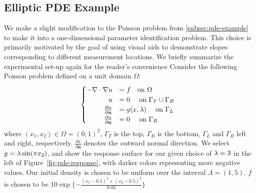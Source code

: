 \subsection{Elliptic PDE Example}\label{sec:pde-example}
We make a slight modification to the Poisson problem from \ref{subsec:pde-example} to make it into a one-dimensional parameter identification problem.
This choice is primarily motivated by the goal of using visual aids to demonstrate slopes corresponding to different measurement locations.
We briefly summarize the experimental set-up again for the reader's convenience
Consider the following Poisson problem defined on a unit domain $\Omega$:
\begin{equation}\label{eq:pde-equation}
\begin{cases}
\hfill -\nabla \cdot \nabla u &= f \quad\text{on } \Omega \\
\hfill u &= 0 \quad\text{ on } \Gamma_T \cup \Gamma_B \\
\hfill \frac{\partial u}{\partial \mathbf{n}} &= g(x,\param) \quad\text{ on } \Gamma_L \\
\hfill \frac{\partial u}{\partial \mathbf{n}} &= 0 \quad\text{ on } \Gamma_R
\end{cases}
\end{equation}
where $(x_1, x_2) \in \Omega = (0,1)^2$, $\Gamma_T$ is the top, $\Gamma_B$ is the bottom, $\Gamma_L$ and $\Gamma_R$ left and right, respectively.
$\frac{\partial u}{\partial \mathbf{n}}$ denotes the outward normal direction.
We select $g=\lambda \sin(\pi x_2)$, and show the response surface for our given choice of $\lambda = 3$ in the left of Figure~\ref{fig:pde-response}, with darker colors representing more negative values.
Our initial density is chosen to be uniform over the interval $\Lambda = (1,5)$.
$f$ is chosen to be $10\exp\{-\frac{(x_1-0.5)^2 + (x_2 - 0.5)^2}{0.02}\}$


